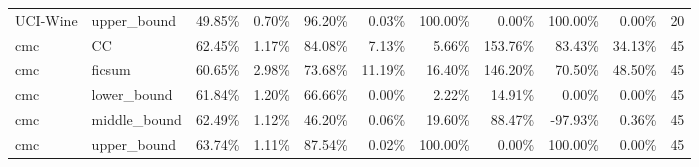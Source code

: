 \begin{tabular}{llrrrrrrrrr}
    UCI-Wine &   upper\_bound &           49.85\% & 0.70\% &     96.20\% &  0.03\% &                  100.00\% &   0.00\% &            100.00\% &  0.00\% &   20 \\
         cmc &            CC &           62.45\% & 1.17\% &     84.08\% &  7.13\% &                    5.66\% & 153.76\% &             83.43\% & 34.13\% &   45 \\
         cmc &        ficsum &           60.65\% & 2.98\% &     73.68\% & 11.19\% &                   16.40\% & 146.20\% &             70.50\% & 48.50\% &   45 \\
         cmc &   lower\_bound &           61.84\% & 1.20\% &     66.66\% &  0.00\% &                    2.22\% &  14.91\% &              0.00\% &  0.00\% &   45 \\
         cmc &  middle\_bound &           62.49\% & 1.12\% &     46.20\% &  0.06\% &                   19.60\% &  88.47\% &            -97.93\% &  0.36\% &   45 \\
         cmc &   upper\_bound &           63.74\% & 1.11\% &     87.54\% &  0.02\% &                  100.00\% &   0.00\% &            100.00\% &  0.00\% &   45 \\
\bottomrule
\end{tabular}
